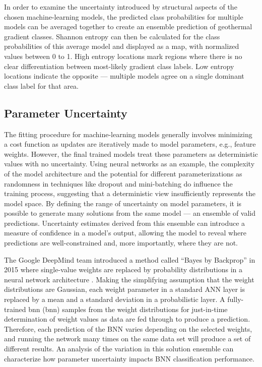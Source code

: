In order to examine the uncertainty introduced by structural aspects of the chosen machine-learning models, the predicted class probabilities for multiple models can be averaged together to create an ensemble prediction of geothermal gradient classes. Shannon entropy can then be calculated for the class probabilities of this average model and displayed as a map, with normalized values between 0 to 1. High entropy locations mark regions where there is no clear differentiation between most-likely gradient class labels. Low entropy locations indicate the opposite --- multiple models agree on a single dominant class label for that area.

\subsection{Parameter Uncertainty}\label{ch3:param_uncertainty}

The fitting procedure for machine-learning models generally involves minimizing a cost function as updates are iteratively made to model parameters, e.g., feature weights. However, the final trained models treat these parameters as deterministic values with no uncertainty. Using neural networks as an example, the complexity of the model architecture and the potential for different parameterizations as randomness in techniques like dropout and mini-batching do influence the training process, suggesting that a deterministic view insufficiently represents the model space. By defining the range of uncertainty on model parameters, it is possible to generate many solutions from the same model --- an ensemble of valid predictions. Uncertainty estimates derived from this ensemble can introduce a measure of confidence in a model’s output, allowing the model to reveal where predictions are well-constrained and, more importantly, where they are not.

The Google DeepMind team introduced a method called ``Bayes by Backprop'' in 2015 where single-value weights are replaced by probability distributions in a neural network architecture \citep{blundell_weight_2015}. Making the simplifying assumption that the weight distributions are Gaussian, each weight parameter in a standard ANN layer is replaced by a mean and a standard deviation in a probabilistic layer. A fully-trained \acrlong{bnn} (\acrshort{bnn}) samples from the weight distributions for just-in-time determination of weight values as data are fed through to produce a prediction. Therefore, each prediction of the BNN varies depending on the selected weights, and running the network many times on the same data set will produce a set of different results. An analysis of the variation in this solution ensemble can characterize how parameter uncertainty impacts BNN classification performance.

